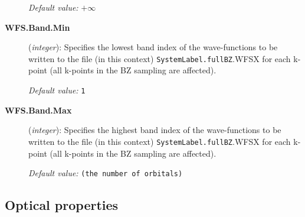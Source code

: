 \documentclass[11pt]{article}
\begin{document}
\begin{description}
{\it Default value:} $+\infty$

\item[{\bf WFS.Band.Min}] ({\it integer}):
Specifies the lowest band index of the wave-functions to be written to 
the file (in this context) {\tt SystemLabel.fullBZ}.WFSX for each k-point (all k-points
in the BZ sampling are affected). 

{\it Default value:} {\tt 1}

\item[{\bf WFS.Band.Max}] ({\it integer}):
Specifies the highest band index of the wave-functions to be written to 
the file (in this context) {\tt SystemLabel.fullBZ}.WFSX for each k-point (all k-points
in the BZ sampling are affected).

{\it Default value:} {\tt (the number of orbitals)}

\end{description}


\vspace{5pt}
\subsection{Optical properties}
\end{document}
